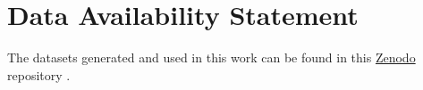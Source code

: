 \documentclass[utf8]{FrontiersinHarvard} %
\begin{document}
\section*{Data Availability Statement}

The datasets generated and used in this work can be found in this \href{https://zenodo.org/records/19408363?preview=1&token=eyJhbGciOiJIUzUxMiJ9.eyJpZCI6ImUxOWVhZTRiLTMxYWYtNDY4NS05ZWVkLTRmMTQ4MDRjMTQ5NyIsImRhdGEiOnt9LCJyYW5kb20iOiIzNGNlYmY2NTNhZDUyN2JhODQ0ZTQ5ZmUzMjYxNjIyMiJ9.ehM6b0ys9Fhe_um9gSyPsoz74RgD4zvm7CaR_tQ9zWmRLXF7iGZRo6lrvu64bs-Jpd89VHTfYd9tgyfWH5cB0w}{Zenodo} repository \citep{muntaner2026fishsizing}.




\end{document}
